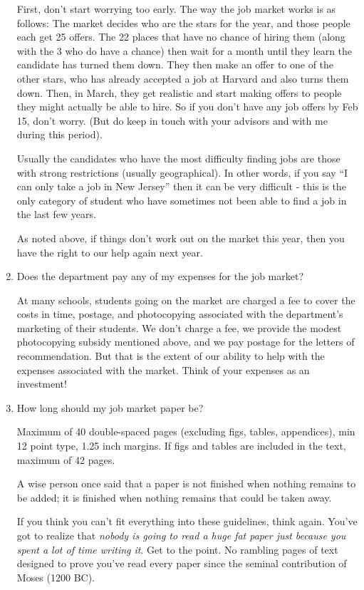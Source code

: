 \documentclass{econtex}
\begin{document}
\begin{enumerate}
First, don't start worrying too early.  The way the job market works
is as follows: The market decides who are the stars for the year, and
those people each get 25 offers.  The 22 places that have no chance of
hiring them (along with the 3 who do have a chance) then wait for a
month until they learn the candidate has turned them down.  They then
make an offer to one of the other stars, who has already accepted a
job at Harvard and also turns them down.  Then, in March, they get
realistic and start making offers to people they might actually be
able to hire.  So if you don't have any job offers by Feb 15, don't
worry.  (But do keep in touch with your advisors and with me during this
period).

Usually the candidates who have the most difficulty finding jobs are
those with strong restrictions (usually geographical).  In other
words, if you say ``I can only take a job in New Jersey'' then it can
be very difficult - this is the only category of student who 
have sometimes not been able to find a job in the last few years.

As noted above, if things don't work out on the market this year, then
you have the right to our help again next year.

\item Does the department pay any of my expenses for the job market?
  
  At many schools, students going on the market are charged a fee to
  cover the costs in time, postage, and photocopying associated with
  the department's marketing of their students.  We don't charge a
  fee, we provide the modest photocopying subsidy mentioned above, and
  we pay postage for the letters of recommendation.  But that is the
  extent of our ability to help with the expenses associated with the
  market.  Think of your expenses as an investment!


\item How long should my job market paper be?
  
  Maximum of 40 double-spaced pages (excluding figs, tables,
  appendices), min 12 point type, 1.25 inch margins.  If figs and
  tables are included in the text, maximum of 42 pages.   
  
  A wise person once said that a paper is not finished when nothing
  remains to be added; it is finished when nothing remains that could
  be taken away.
  
  If you think you can't fit everything into these guidelines, think
  again.  You've got to realize that {\it nobody is going to read a
    huge fat paper just because you spent a lot of time writing it}.
  Get to the point.  No rambling pages of text designed to prove you've
  read every paper since the seminal contribution of Moses (1200 BC).
  

\end{enumerate}
\end{document}
